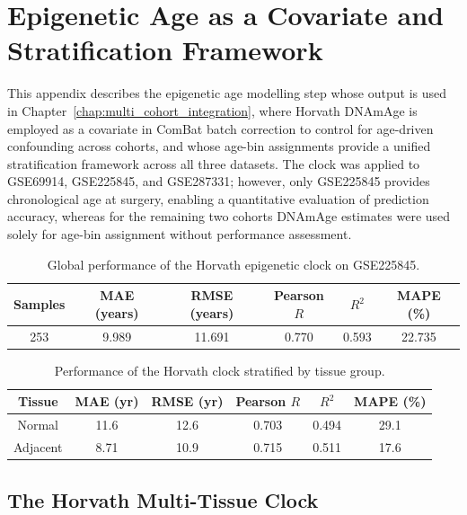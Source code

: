 \chapter{Epigenetic Age as a Covariate and Stratification Framework}
\label{app:age_estimation}

This appendix describes the epigenetic age modelling step whose output is used
in Chapter~\ref{chap:multi_cohort_integration}, where Horvath DNAmAge is employed
as a covariate in ComBat batch correction to control for age-driven confounding
across cohorts, and whose age-bin assignments provide a unified stratification
framework across all three datasets. The clock was applied to GSE69914,
GSE225845, and GSE287331; however, only GSE225845 provides chronological age
at surgery, enabling a quantitative evaluation of prediction accuracy, whereas
for the remaining two cohorts DNAmAge estimates were used solely for age-bin
assignment without performance assessment. 

\begin{table}[t]
\centering
\scriptsize
\caption{Global performance of the Horvath epigenetic clock on GSE225845.}
\label{tab:app:horvath_global}
\begin{tabular}{c c c c c c}
\toprule
Samples & MAE (years) & RMSE (years) & Pearson $R$ & $R^{2}$ & MAPE (\%) \\
\midrule
253 & 9.989 & 11.691 & 0.770 & 0.593 & 22.735 \\
\bottomrule
\end{tabular}
\end{table}
\begin{table}[t]
\centering
\scriptsize
\caption{Performance of the Horvath clock stratified by tissue group.}
\label{tab:app:horvath_by_tissue}
\begin{tabular}{c c c c c c}
\toprule
Tissue & MAE (yr) & RMSE (yr) & Pearson $R$ & $R^{2}$ & MAPE (\%) \\
\midrule
Normal   & 11.6  & 12.6 & 0.703 & 0.494 & 29.1 \\
Adjacent & 8.71  & 10.9 & 0.715 & 0.511 & 17.6 \\
\bottomrule
\end{tabular}
\end{table}

\section{The Horvath Multi-Tissue Clock}
\label{app:age:theory}

